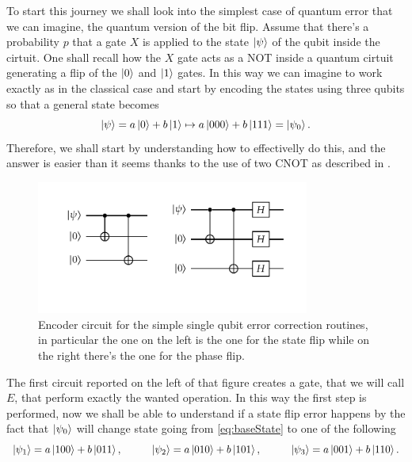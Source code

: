 To start this journey we shall look into the simplest case of quantum error that we can imagine, the quantum version of the bit flip. Assume that there's a probability $p$ that a gate $X$ is applied to the state $\ket{\psi}$ of the qubit inside the cirtuit. One shall recall how the $X$ gate acts as a NOT inside a quantum cirtuit generating a flip of the $\ket{0}$ and $\ket{1}$ gates. In this way we can imagine to work exactly as in the classical case and start by encoding the states using three qubits so that a general state becomes
\begin{equation}
    \label{eq:baseState}
    \ket{\psi} = a\ket{0} + b\ket{1} \mapsto a \ket{000} + b \ket{111} = \ket{\psi_0}.
\end{equation}
Therefore, we shall start by understanding how to effectivelly do this, and the answer is easier than it seems thanks to the use of two CNOT as described in .
\begin{figure}[t]
    \centering
    \includegraphics[width=0.8\textwidth]{Immagini/SinQuEncod.pdf}
    \caption{
        Encoder circuit for the simple single qubit error correction routines, in particular the one on the left is the one for the state flip while on the right there's the one for the phase flip.
    }
    \label{fig:SinQuEncod}
\end{figure}
The first circuit reported on the left of that figure creates a gate, that we will call $E$, that perform exactly the wanted operation. In this way the first step is performed, now we shall be able to understand if a state flip error happens by the fact that $\ket{\psi_0}$ will change state going from \eqref{eq:baseState} to one of the following
\begin{equation}
    \label{eq:FlippedStates}
    \ket{\psi_1} = a\ket{100} + b \ket{011}, \hspace{1cm} \ket{\psi_2} = a\ket{010} + b\ket{101}, \hspace{1cm} \ket{\psi_3} = a\ket{001} + b\ket{110}.
\end{equation}

